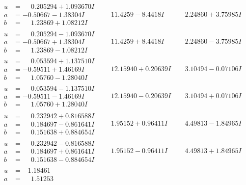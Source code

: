\documentclass[1p]{elsarticle_modified}
\theoremstyle{definition}
\begin{document}
$$\begin{array}{c|c|c}
\begin{aligned}
u &= \phantom{-}0.205294 + 1.093670 I \\
a &= -0.50667 - 1.38304 I \\
b &= \phantom{-}1.23869 + 1.08212 I\end{aligned}
 & \phantom{-}11.4259 - 8.4418 I & \phantom{-}2.24860 + 3.75985 I \\ \hline\begin{aligned}
u &= \phantom{-}0.205294 - 1.093670 I \\
a &= -0.50667 + 1.38304 I \\
b &= \phantom{-}1.23869 - 1.08212 I\end{aligned}
 & \phantom{-}11.4259 + 8.4418 I & \phantom{-}2.24860 - 3.75985 I \\ \hline\begin{aligned}
u &= \phantom{-}0.053594 + 1.137510 I \\
a &= -0.59511 + 1.46169 I \\
b &= \phantom{-}1.05760 - 1.28040 I\end{aligned}
 & \phantom{-}12.15940 + 0.20639 I & \phantom{-}3.10494 - 0.07106 I \\ \hline\begin{aligned}
u &= \phantom{-}0.053594 - 1.137510 I \\
a &= -0.59511 - 1.46169 I \\
b &= \phantom{-}1.05760 + 1.28040 I\end{aligned}
 & \phantom{-}12.15940 - 0.20639 I & \phantom{-}3.10494 + 0.07106 I \\ \hline\begin{aligned}
u &= \phantom{-}0.232942 + 0.816588 I \\
a &= \phantom{-}0.184697 - 0.861641 I \\
b &= \phantom{-}0.151638 + 0.884654 I\end{aligned}
 & \phantom{-}1.95152 + 0.96411 I & \phantom{-}4.49813 - 1.84965 I \\ \hline\begin{aligned}
u &= \phantom{-}0.232942 - 0.816588 I \\
a &= \phantom{-}0.184697 + 0.861641 I \\
b &= \phantom{-}0.151638 - 0.884654 I\end{aligned}
 & \phantom{-}1.95152 - 0.96411 I & \phantom{-}4.49813 + 1.84965 I \\ \hline\begin{aligned}
u &= -1.18461\phantom{ +0.000000I} \\
a &= \phantom{-}1.51253\phantom{ +0.000000I} \\

\end{aligned}
\end{array}$$
\end{document}
